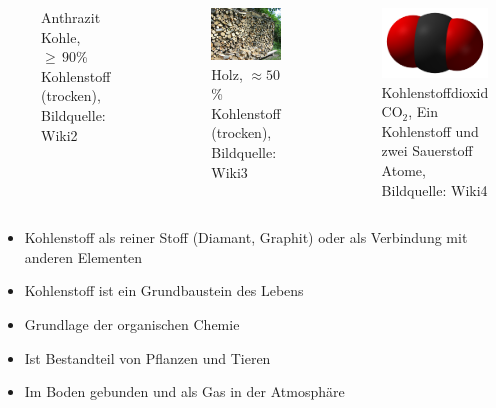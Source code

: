 \begin{frame}
\begin{columns}
\begin{figure}
			\caption{Anthrazit Kohle, $\geq\,90$\% Kohlenstoff (trocken), Bildquelle: Wiki2}
		\end{figure}
		\begin{figure}
			\centering
			\includegraphics[width=\linewidth]{bilder/kohlenstoff/holz}
			\caption{Holz, $\approx 50$\% Kohlenstoff (trocken), Bildquelle: Wiki3}
		\end{figure}
		\begin{figure}
			\centering
			\includegraphics[width=\linewidth]{bilder/kohlenstoff/co2}
			\caption{Kohlenstoffdioxid $\text{CO}_2$, Ein Kohlenstoff und zwei Sauerstoff Atome, Bildquelle: Wiki4}
		\end{figure}
	\end{columns}
		\begin{itemize}
			\item Kohlenstoff als reiner Stoff (Diamant, Graphit) oder als Verbindung mit anderen Elementen
			\item Kohlenstoff ist ein Grundbaustein des Lebens
			\item Grundlage der organischen Chemie
			\item Ist Bestandteil von Pflanzen und Tieren
			\item Im Boden gebunden und als Gas in der Atmosphäre
		\end{itemize}


\end{frame}
